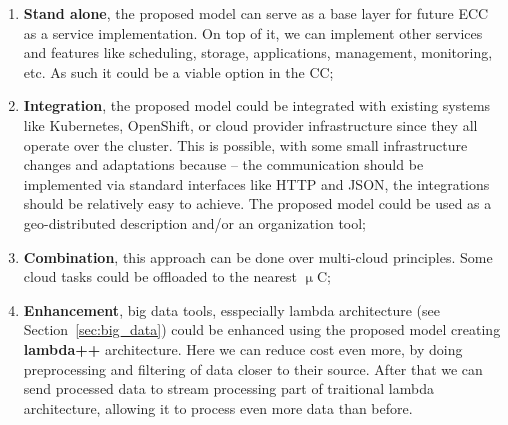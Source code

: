 \begin{enumerate}[start=1,label={(\bfseries \arabic*)}]
	\item \textbf{Stand alone}, the proposed model can serve as a base layer for future ECC as a service implementation. On top of it, we can implement other services and features like scheduling, storage, applications, management, monitoring, etc. As such it could be a viable option in the CC;
	\item \textbf{Integration}, the proposed model could be integrated with existing systems like Kubernetes, OpenShift, or cloud provider infrastructure since they all operate over the cluster. This is possible, with some small infrastructure changes and adaptations because -- the communication should be implemented via standard interfaces like HTTP and JSON, the integrations should be relatively easy to achieve. The proposed model could be used as a geo-distributed description and/or an organization tool;
	\item \textbf{Combination}, this approach can be done over multi-cloud principles. Some cloud tasks could be offloaded to the nearest $\upmu$C;
	\item \textbf{Enhancement}, big data tools, esspecially lambda architecture (see Section~\ref{sec:big_data}) could be enhanced using the proposed model creating \textbf{lambda++} architecture. Here we can reduce cost even more, by doing preprocessing and filtering of data closer to their source. After that we can send processed data to stream processing part of traitional lambda architecture, allowing it to process even more data than before.
\end{enumerate} 
%
%